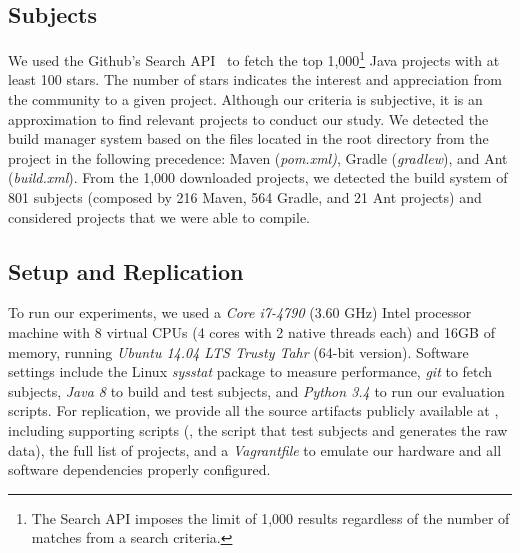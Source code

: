 \subsection{Subjects}
\label{sec:subjects}

We used the Github's
Search API~\cite{githubsearch} to fetch the top 1,000\footnote{The
    Search API imposes the limit of 1,000 results regardless of the
number of matches from a search criteria.} Java projects with at
least 100 stars. The number of stars indicates the interest and
appreciation from the community to a given project.
 Although our
criteria is subjective, it is an approximation to find relevant
projects to conduct our study. We detected the build manager system
based on the files located in the root directory from the project in
the following precedence: Maven (\emph{pom.xml)}, Gradle
(\emph{gradlew}), and Ant (\emph{build.xml}).
From the 1,000 downloaded projects, we detected the build system of
801 subjects (composed by 216 Maven, 564 Gradle, and 21 Ant projects)
and considered  projects that we were able to compile.

\subsection{Setup and Replication}
\label{sec:setup}

To run our experiments, we used a \emph{Core i7-4790} (3.60 GHz) Intel
processor machine with 8 virtual CPUs (4 cores with 2 native threads
each) and 16GB of memory, running \emph{Ubuntu 14.04 LTS Trusty Tahr}
(64-bit version). Software settings include the Linux \emph{sysstat}
package to measure performance, \emph{git} to fetch subjects,
\emph{Java 8} to build and test subjects, and \emph{Python 3.4} to run
our evaluation scripts. For replication, we provide all the source
artifacts publicly available at , including
supporting scripts (\eg, the script that test subjects and generates
the raw data), the full list of projects, and a \emph{Vagrantfile} to
emulate our hardware and all software dependencies properly configured.


